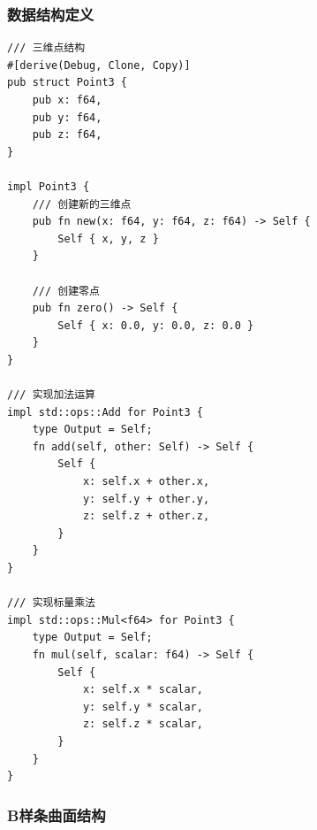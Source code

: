 \documentclass[12pt,a4paper]{article}
\begin{document}
\subsubsection{数据结构定义}

\begin{lstlisting}[style=ruststyle, caption={三维点结构}]
/// 三维点结构
#[derive(Debug, Clone, Copy)]
pub struct Point3 {
    pub x: f64,
    pub y: f64,
    pub z: f64,
}

impl Point3 {
    /// 创建新的三维点
    pub fn new(x: f64, y: f64, z: f64) -> Self {
        Self { x, y, z }
    }

    /// 创建零点
    pub fn zero() -> Self {
        Self { x: 0.0, y: 0.0, z: 0.0 }
    }
}

/// 实现加法运算
impl std::ops::Add for Point3 {
    type Output = Self;
    fn add(self, other: Self) -> Self {
        Self {
            x: self.x + other.x,
            y: self.y + other.y,
            z: self.z + other.z,
        }
    }
}

/// 实现标量乘法
impl std::ops::Mul<f64> for Point3 {
    type Output = Self;
    fn mul(self, scalar: f64) -> Self {
        Self {
            x: self.x * scalar,
            y: self.y * scalar,
            z: self.z * scalar,
        }
    }
}
\end{lstlisting}

\subsubsection{B样条曲面结构}
\end{document}

